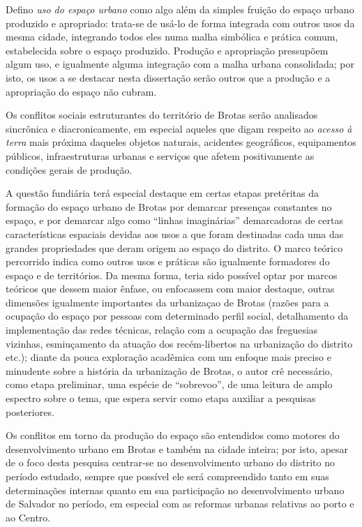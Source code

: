 Defino \textit{uso do espaço urbano} como algo além da simples fruição do espaço urbano produzido e apropriado: trata-se de usá-lo de forma integrada com outros usos da mesma cidade, integrando todos eles numa malha simbólica e prática comum, estabelecida sobre o espaço produzido. Produção e apropriação pressupõem algum uso, e igualmente alguma integração com a malha urbana consolidada; por isto, os usos a se destacar nesta dissertação serão outros que a produção e a apropriação do espaço não cubram.

Os conflitos sociais estruturantes do território de Brotas serão analisados sincrônica e diacronicamente, em especial aqueles que digam respeito ao \textit{acesso à terra} mais próxima daqueles objetos naturais, acidentes geográficos, equipamentos públicos, infraestruturas urbanas e serviços que afetem positivamente as condições gerais de produção. 

A questão fundiária terá especial destaque em certas etapas pretéritas da formação do espaço urbano de Brotas por demarcar presenças constantes no espaço, e por demarcar algo como ``linhas imaginárias'' demarcadoras de certas características espaciais devidas aos usos a que foram destinadas cada uma das grandes propriedades que deram origem ao espaço do distrito. O marco teórico percorrido indica como outros usos e práticas são igualmente formadores do espaço e de territórios. Da mesma forma, teria sido possível optar por marcos teóricos que dessem maior ênfase, ou enfocassem com maior destaque, outras dimensões igualmente importantes da urbanizaçao de Brotas (razões para a ocupação do espaço por pessoas com determinado perfil social, detalhamento da implementação das redes técnicas, relação com a ocupação das freguesias vizinhas, esmiuçamento da atuação dos recém-libertos na urbanização do distrito etc.); diante da pouca exploração acadêmica com um enfoque mais preciso e minudente sobre a história da urbanização de Brotas, o autor crê necessário, como etapa preliminar, uma espécie de ``sobrevoo'', de uma leitura de amplo espectro sobre o tema, que espera servir como etapa auxiliar a pesquisas posteriores. 

Os conflitos em torno da produção do espaço são entendidos como motores do desenvolvimento urbano em Brotas e também na cidade inteira; por isto, apesar de o foco desta pesquisa centrar-se no desenvolvimento urbano do distrito no período estudado, sempre que possível ele será compreendido tanto em suas determinações internas quanto em sua participação no desenvolvimento urbano de Salvador no período, em especial com as reformas urbanas relativas ao porto e ao Centro. 

